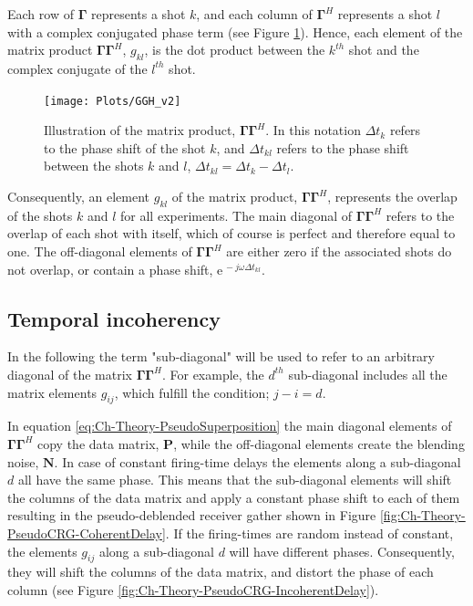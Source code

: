Each row of $\mathbf{\Gamma}$ represents a shot $k$, and each column of $\mathbf{\Gamma}^H$ represents a shot $l$ with a complex conjugated phase term (see Figure \ref{fig:Ch-Theory-GGH}). Hence, each element of the matrix product $\mathbf{\Gamma \Gamma}^H$, $g_{kl}$, is the dot product between the $k^{th}$ shot and the complex conjugate of the $l^{th}$ shot.

\begin{figure}
	\centering
	\texttt{[image: Plots/GGH\_v2]}
	\caption{Illustration of the matrix product, $\mathbf{\Gamma \Gamma}^H$. In this notation $\Delta t_k$ refers to the phase shift of the shot $k$, and $\Delta t_{kl}$ refers to the phase shift between the shots $k$ and $l$, $\Delta t_{kl} = \Delta t_k - \Delta t_l$.}
	\label{fig:Ch-Theory-GGH}
\end{figure}

Consequently, an element $g_{kl}$ of the matrix product, $\mathbf{\Gamma \Gamma}^H$, represents the overlap of the shots $k$ and $l$ for all experiments. The main diagonal of $\mathbf{\Gamma \Gamma}^H$ refers to the overlap of each shot with itself, which of course is perfect and therefore equal to one. The off-diagonal elements of $\mathbf{\Gamma \Gamma}^H$ are either zero if the associated shots do not overlap, or contain a phase shift, $\mathrm{e}^{\, -j \omega \Delta t_{kl}}$.

\subsection*{Temporal incoherency}

In the following the term "sub-diagonal" will be used to refer to an arbitrary diagonal of the matrix $\mathbf{\Gamma \Gamma}^H$. For example, the $d^{th}$ sub-diagonal includes all the matrix elements $g_{ij}$, which fulfill the condition; $j -i = d$.

In equation \ref{eq:Ch-Theory-PseudoSuperposition} the main diagonal elements of $\mathbf{\Gamma \Gamma}^H$ copy the data matrix, $\mathbf{P}$, while the off-diagonal elements create the blending noise, $\mathbf{N}$. In case of constant firing-time delays the elements along a sub-diagonal $d$ all have the same phase. This means that the sub-diagonal elements will shift the columns of the data matrix and apply a constant phase shift to each of them resulting in the pseudo-deblended receiver gather shown in Figure \ref{fig:Ch-Theory-PseudoCRG-CoherentDelay}. If the firing-times are random instead of constant, the elements $g_{ij}$ along a sub-diagonal $d$ will have different phases. Consequently, they will shift the columns of the data matrix, and distort the phase of each column (see Figure \ref{fig:Ch-Theory-PseudoCRG-IncoherentDelay}). 

